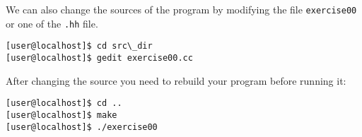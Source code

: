 \documentclass[12pt,a4paper]{article}
\begin{document}
We can also change the sources of the program by modifying the file
\lstinline{exercise00} or one of the \lstinline{.hh} file.
\begin{lstlisting}
[user@localhost]$ cd src\_dir
[user@localhost]$ gedit exercise00.cc
\end{lstlisting}
After changing the source you need to rebuild your program before
running it:
\begin{lstlisting}
[user@localhost]$ cd ..
[user@localhost]$ make
[user@localhost]$ ./exercise00
\end{lstlisting}%
\end{document}
